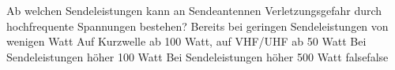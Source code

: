     {Ab welchen Sendeleistungen kann an Sendeantennen Verletzungsgefahr durch hochfrequente Spannungen bestehen?}
    {Bereits bei geringen Sendeleistungen von wenigen Watt}
    {Auf Kurzwelle ab 100 Watt, auf VHF/UHF ab 50 Watt}
    {Bei Sendeleistungen höher 100 Watt}
    {Bei Sendeleistungen höher 500 Watt}
    {false}{false}